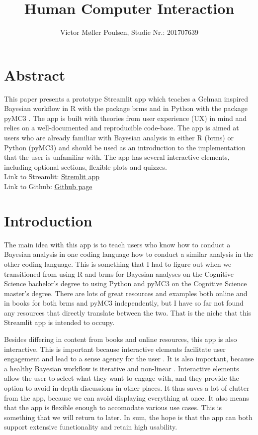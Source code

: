 \documentclass[12pt]{article}
\title{Human Computer Interaction}
\author{Victor Møller Poulsen, Studie Nr.: 201707639}
\begin{document}
\maketitle
\leavevmode

\section{Abstract}
This paper presents a prototype Streamlit app which teaches a Gelman
\autocite{gelman2020bayesian} inspired Bayesian workflow
in R with the package brms \autocite{Burkner2017} and in Python with the
package pyMC3 \autocite{Salvatier2016}. The app is built with theories from user
experience (UX) in mind and relies on a well-documented and reproducible code-base. The app is
aimed at users who are already familiar with Bayesian analysis in either R
(brms) or Python (pyMC3) and should be used as an introduction to the
implementation that the user is unfamiliar with. The app has several
interactive elements, including optional sections, flexible plots and quizzes. \\
Link to Streamlit: \href{https://share.streamlit.io/victor-m-p/bayesworkflow/main/BayesWorkflow.py}{Stremlit app}\\
Link to Github: \href{https://github.com/victor-m-p/BayesWorkflow}{Github page}

\tableofcontents
\newpage
\section{Introduction}

The main idea with this app is to teach users who know how to conduct a Bayesian analysis in one coding
language how to conduct a similar analysis in the other coding language. This is something
that I had to figure out when we transitioned from using R and brms for Bayesian analyses
on the Cognitive Science bachelor's degree to using Python and pyMC3 on the Cognitive Science
master's degree. There are lots of great resources and examples both online and in books for both
brms and pyMC3 independently, but I have so far not found any resources that
directly translate between
the two. That is the niche that this Streamlit app is intended to occupy.

\vspace{5mm}

Besides differing in content from books and online resources, this app is also interactive.
This is important because interactive elements facilitate user engagement and
lead to a sense agency for the user \autocite{janlert2017meaning}. It is also important, because a healthy
Bayesian workflow is iterative and non-linear \autocite{gelman2020bayesian}.
Interactive elements allow the user to select what they want to engage
with, and they provide the option to avoid in-depth discussions in other places.
It thus saves a lot of
clutter from the app, because we can avoid displaying everything at once.
It also means that the app is flexible enough to accomodate various use cases.
This is something that we will return to later.
In sum, the hope is that the app can both support extensive functionality and retain high usability.
\end{document}
